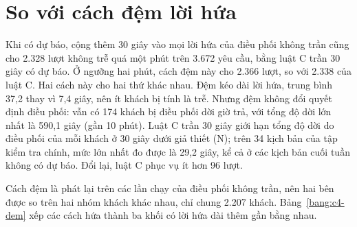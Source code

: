 \section{So với cách đệm lời hứa}
\label{muc:c4-dem}

Khi có dự báo, cộng thêm 30 giây vào mọi lời hứa của điều phối không trần cũng cho 2.328 lượt không trễ quá một phút
trên 3.672 yêu cầu, bằng luật C trần 30 giây có dự báo. Ở ngưỡng hai phút, cách đệm này cho 2.366 lượt, so với 2.338
của luật C. Hai cách này cho hai thứ khác nhau. Đệm kéo dài lời hứa, trung bình 37,2 thay vì 7,4 giây, nên ít khách bị tính là trễ. Nhưng đệm không đổi
quyết định điều phối: vẫn có 174 khách bị điều phối dời giờ trả, với tổng độ dời lớn nhất là 590,1 giây (gần 10 phút).
Luật C trần 30 giây giới hạn tổng độ dời do điều phối của mỗi khách ở 30 giây dưới giả thiết (N); trên 34 kịch bản của
tập kiểm tra chính, mức lớn nhất đo được là 29,2 giây, kể cả ở các kịch bản cuối tuần không có dự báo. Đổi lại, luật C
phục vụ ít hơn 96 lượt.

Cách đệm là phát lại trên các lần chạy của điều phối không trần, nên hai bên được so trên hai nhóm khách khác nhau, chỉ
chung 2.207 khách. Bảng~\ref{bang:c4-dem} xếp các cách hứa thành ba khối có lời hứa dài thêm gần bằng nhau.


